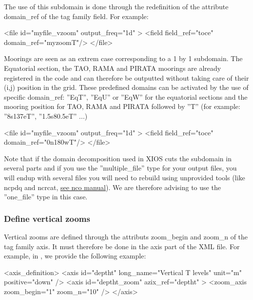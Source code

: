 \documentclass[../main/NEMO_manual]{subfiles}
\begin{document}
The use of this subdomain is done through the redefinition of the attribute domain\_ref of the tag family field.
For example:

\begin{xmllines}
<file id="myfile_vzoom" output_freq="1d" >
	<field field_ref="toce" domain_ref="myzoomT"/>
</file>
\end{xmllines}

Moorings are seen as an extrem case corresponding to a 1 by 1 subdomain.
The Equatorial section, the TAO, RAMA and PIRATA moorings are already registered in the code and
can therefore be outputted without taking care of their (i,j) position in the grid.
These predefined domains can be activated by the use of specific domain\_ref:
''EqT'', ''EqU'' or ''EqW'' for the equatorial sections and
the mooring position for TAO, RAMA and PIRATA followed by ''T'' (for example: ''8s137eT'', ''1.5s80.5eT'' ...)

\begin{xmllines}
<file id="myfile_vzoom" output_freq="1d" >
	<field field_ref="toce" domain_ref="0n180wT"/>
</file>
\end{xmllines}

Note that if the domain decomposition used in XIOS cuts the subdomain in several parts and if
you use the ''multiple\_file'' type for your output files,
you will endup with several files you will need to rebuild using unprovided tools (like ncpdq and ncrcat,
\href{http://nco.sourceforge.net/nco.html#Concatenation}{see nco manual}).
We are therefore advising to use the ''one\_file'' type in this case.

\subsubsection{Define vertical zooms}

Vertical zooms are defined through the attributs zoom\_begin and zoom\_n of the tag family axis.
It must therefore be done in the axis part of the XML file.
For example, in , we provide the following example:

\begin{xmllines}
<axis_definition>
	<axis id="deptht" long_name="Vertical T levels" unit="m" positive="down" />
	<axis id="deptht_zoom" azix_ref="deptht" >
		<zoom_axis zoom_begin="1" zoom_n="10" />
	</axis>
\end{xmllines}
\end{document}
